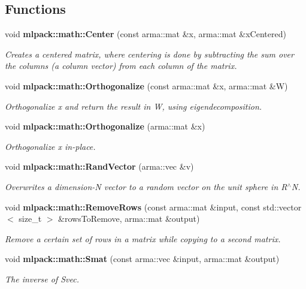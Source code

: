 \subsection*{Functions}
\begin{DoxyCompactItemize}
\item 
void {\bf mlpack\+::math\+::\+Center} (const arma\+::mat \&x, arma\+::mat \&x\+Centered)
\begin{DoxyCompactList}\small\item\em Creates a centered matrix, where centering is done by subtracting the sum over the columns (a column vector) from each column of the matrix. \end{DoxyCompactList}\item 
void {\bf mlpack\+::math\+::\+Orthogonalize} (const arma\+::mat \&x, arma\+::mat \&W)
\begin{DoxyCompactList}\small\item\em Orthogonalize x and return the result in W, using eigendecomposition. \end{DoxyCompactList}\item 
void {\bf mlpack\+::math\+::\+Orthogonalize} (arma\+::mat \&x)
\begin{DoxyCompactList}\small\item\em Orthogonalize x in-\/place. \end{DoxyCompactList}\item 
void {\bf mlpack\+::math\+::\+Rand\+Vector} (arma\+::vec \&v)
\begin{DoxyCompactList}\small\item\em Overwrites a dimension-\/N vector to a random vector on the unit sphere in R$^\wedge$N. \end{DoxyCompactList}\item 
void {\bf mlpack\+::math\+::\+Remove\+Rows} (const arma\+::mat \&input, const std\+::vector$<$ size\+\_\+t $>$ \&rows\+To\+Remove, arma\+::mat \&output)
\begin{DoxyCompactList}\small\item\em Remove a certain set of rows in a matrix while copying to a second matrix. \end{DoxyCompactList}\item 
void {\bf mlpack\+::math\+::\+Smat} (const arma\+::vec \&input, arma\+::mat \&output)
\begin{DoxyCompactList}\small\item\em The inverse of Svec. \end{DoxyCompactList}\item 

\end{DoxyCompactItemize}
